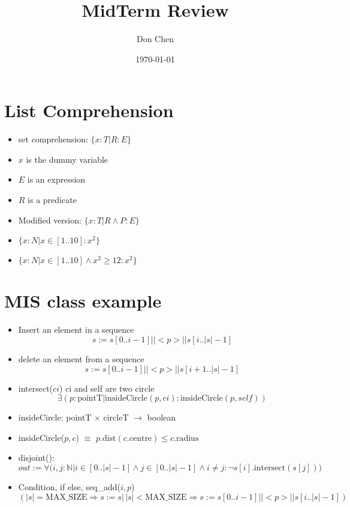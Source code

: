 \documentclass[12pt]{article}
\title{MidTerm Review}
\author{Don Chen}
\date{\today}
\begin{document}
\section{List Comprehension}
\begin{itemize}
    \item set comprehension: $\{ x: T | R :  E \}$
    \item $x$ is the dummy variable
    \item $E$ is an expression
    \item $R$ is a predicate
    \item Modified version: $\{ x: T | R \wedge P:  E \}$
    \item {$\{ x: N | x \in [1..10] :  x^2 \}$}
    \item {$\{ x: N | x \in [1..10] \wedge x^2 \geq 12: x^2\}$}
\end{itemize}

\section{MIS class example}
\begin{itemize}
    \item Insert an element in a sequence
    $$s := s[0..i-1] || <p> || s[i..|s|-1]$$
    \item delete an element from a sequence
    $$s := s[0..i-1] || <p> || s[i+1..|s|-1]$$
    \item intersect($ci$) ci and self are two circle
    $$\exists ( p: \mbox{pointT} | \mbox{insideCircle}(p, ci) : \mbox{insideCircle}(p, \mathit{self}))$$
    \item insideCircle: pointT $\times$ circleT $\rightarrow$ boolean
    \item insideCircle($p, c$) $\equiv$ {$p.\mbox{dist}(c.\mbox{centre}) \leq c.\mbox{radius}$}
    \item disjoint():
    $$out
    :={\forall}{(i,j:\mathbb{N}} | {i \in [0 .. |s| -1] \wedge j \in [0 .. |s| -1] \wedge i \neq j}:{\neg s[i].\mbox{intersect}(s[j])})$$
    \item Condition, if else, seq\_add($i, p$)
    $$(|s| = \mbox{MAX\_SIZE} \Rightarrow s := s |\,  |s| <
    \mbox{MAX\_SIZE} \Rightarrow s := s[0..i-1] || <p> || s[i..|s|-1] )$$
    
\end{itemize}
\end{document}

